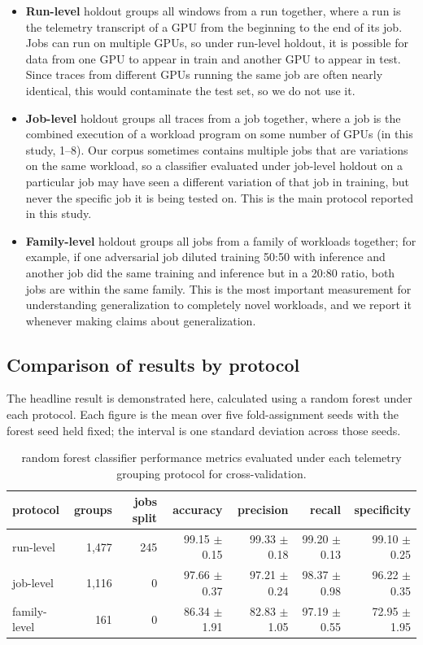 \begin{itemize}\itemsep2pt
  \item \textbf{Run-level} holdout groups all windows from a run together, where a run is the telemetry transcript of a GPU from the beginning to the end of its job. Jobs can run on multiple GPUs, so under run-level holdout, it is possible for data from one GPU to appear in train and another GPU to appear in test. Since traces from different GPUs running the same job are often nearly identical, this would contaminate the test set, so we do not use it.
  \item \textbf{Job-level} holdout groups all traces from a job together, where a job is the combined execution of a workload program on some number of GPUs (in this study, 1--8). Our corpus sometimes contains multiple jobs that are variations on the same workload, so a classifier evaluated under job-level holdout on a particular job may have seen a different variation of that job in training, but never the specific job it is being tested on. This is the main protocol reported in this study.
  \item \textbf{Family-level} holdout groups all jobs from a family of workloads together; for example, if one adversarial job diluted training 50:50 with inference and another job did the same training and inference but in a 20:80 ratio, both jobs are within the same family. This is the most important measurement for understanding generalization to completely novel workloads, and we report it whenever making claims about generalization.
\end{itemize}

\subsection{Comparison of results by protocol}

The headline result is demonstrated here, calculated using a random forest under each protocol. Each figure is the mean over five fold-assignment seeds with the forest seed held fixed; the interval is one standard deviation across those seeds.

\begin{table}[htbp]
\centering
\footnotesize
\begin{tabular}{lrrrrrr}
\toprule
\textbf{protocol} & \textbf{groups} & \textbf{jobs split} & \textbf{accuracy} & \textbf{precision} & \textbf{recall} & \textbf{specificity} \\
\midrule
run-level & 1,477 & 245 & 99.15 $\pm$ 0.15 & 99.33 $\pm$ 0.18 & 99.20 $\pm$ 0.13 & 99.10 $\pm$ 0.25 \\
job-level & 1,116 & 0 & 97.66 $\pm$ 0.37 & 97.21 $\pm$ 0.24 & 98.37 $\pm$ 0.98 & 96.22 $\pm$ 0.35 \\
family-level & 161 & 0 & 86.34 $\pm$ 1.91 & 82.83 $\pm$ 1.05 & 97.19 $\pm$ 0.55 & 72.95 $\pm$ 1.95 \\
\bottomrule
\end{tabular}
\caption{random forest classifier performance metrics evaluated under each telemetry grouping protocol for cross-validation.}
\label{tab:protocol}
\end{table}

